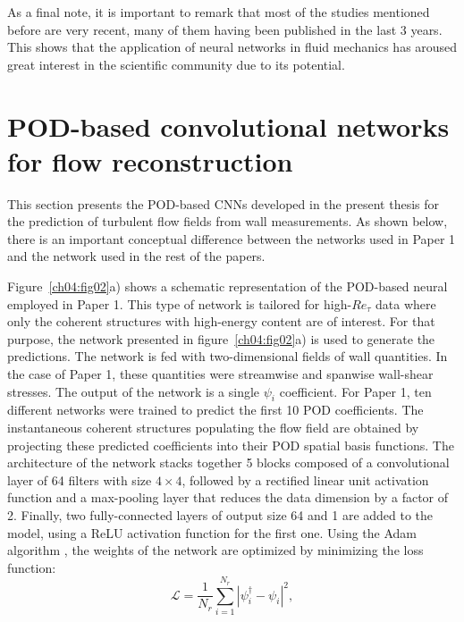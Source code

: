 As a final note, it is important to remark that most of the studies mentioned before are very recent, many of them having been published in the last 3 years.
This shows that the application of neural networks in fluid mechanics has aroused great interest in the scientific community due to its potential.

\section{POD-based convolutional networks for flow reconstruction}\label{ch03:s3}
This section presents the POD-based CNNs developed in the present thesis for the prediction of turbulent flow fields from wall measurements.
As shown below, there is an important conceptual difference between the networks used in Paper 1 and the network used in the rest of the papers.

Figure~\ref{ch04:fig02}a) shows a schematic representation of the POD-based neural employed in Paper 1.
This type of network is tailored for high-$Re_{\tau}$ data where only the coherent structures with high-energy content are of interest.
For that purpose, the network presented in figure~\ref{ch04:fig02}a) is used to generate the predictions.
The network is fed with two-dimensional fields of wall quantities.
In the case of Paper 1, these quantities were streamwise and spanwise wall-shear stresses.
The output of the network is a single $\psi_i$ coefficient.
For Paper 1, ten different networks were trained to predict the first 10 POD coefficients.
The instantaneous coherent structures populating the flow field are obtained by projecting these predicted coefficients into their POD spatial basis functions.
The architecture of the network stacks together 5 blocks composed of a convolutional layer of 64 filters with size $4\times4$, followed by a rectified linear unit \citep[ReLU, see][]{nair2010rectified} activation function and a max-pooling layer that reduces the data dimension by a factor of 2.
Finally, two fully-connected layers of output size 64 and 1 are added to the model, using a ReLU activation function for the first one.
Using the Adam algorithm \citep{kingma2014adam}, the weights of the network are optimized by minimizing the loss function:
\begin{equation}
    \mathcal{L}=\frac{1}{N_r}\sum^{N_r}_{i=1}|\psi^{\dagger}_i - \psi_i|^2,
    \label{ch04:eq8}
\end{equation}

